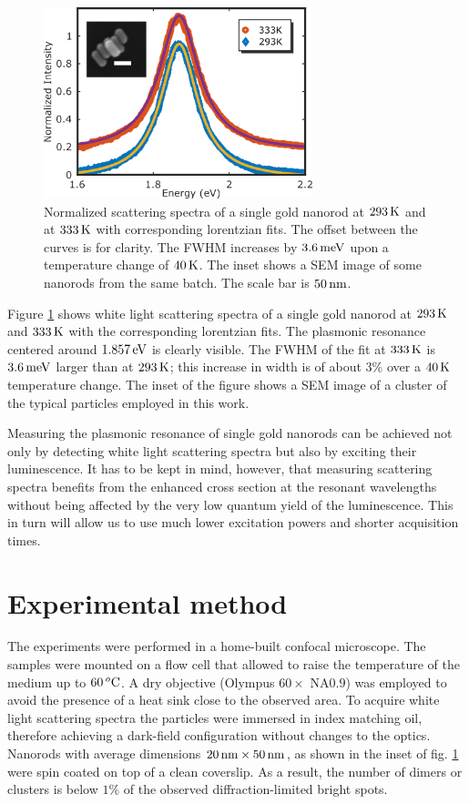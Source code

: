 \begin{figure}[tp] \centering
\includegraphics[width=78mm]{Chapters/05_WhiteLight/Figures/01_Spectra_Example/01_Spectra_Example.png}
\caption{Normalized scattering spectra of a single gold nanorod at $293\,\textrm{K}$ and
at $333\,\textrm{K}$ with corresponding lorentzian fits. The offset between the curves is for
clarity. The FWHM increases by $3.6\,\textrm{meV}$ upon a temperature change of $40\,\textrm{K}$.
The inset shows a SEM image of some nanorods from the same batch. The scale bar
is $50\,\textrm{nm}$.}
	\label{fig:scattering_spectra}
\end{figure}

Figure \ref{fig:scattering_spectra} shows white light scattering spectra of a single
gold nanorod at $293\,\textrm{K}$ and $333\,\textrm{K}$ with the corresponding lorentzian fits. The
plasmonic resonance centered around $1.857\,\textrm{eV}$ is clearly visible. The FWHM of
the fit at $333\,\textrm{K}$ is $3.6\,\textrm{meV}$ larger than at $293\,\textrm{K}$; this increase in width
is of about $3\%$ over a $40\,\textrm{K}$ temperature change. The inset of the figure
shows a SEM image of a cluster of the typical particles employed in this work.

Measuring the plasmonic resonance of single gold nanorods can be achieved not
only by detecting white light scattering spectra but also by exciting their
luminescence\cite{Konrad2013}. It has to be kept in mind, however, that
measuring scattering spectra benefits from the enhanced cross section at the
resonant wavelengths without being affected by the very low quantum yield of the
luminescence\cite{Yorulmaz2012}. This in turn will allow us to use much lower
excitation powers and shorter acquisition times.

\section{Experimental method}

The experiments were performed in a home-built confocal microscope. The samples
were mounted on a flow cell that allowed to raise the temperature of the
medium up to $60\,^o\textrm{C}$. A dry objective (Olympus $60\times$ NA$0.9$) was
employed to avoid the presence of a heat sink close to the observed area. To
acquire white light scattering spectra the particles were immersed in index
matching oil, therefore achieving a dark-field configuration without changes to
the optics. Nanorods with average dimensions $20\,\textrm{nm}\times50\,\textrm{nm}$, as shown in the
inset of fig. \ref{fig:scattering_spectra} were spin coated on top of a clean
coverslip. As a result, the number of dimers or clusters is below $1\%$ of the
observed diffraction-limited bright spots.

